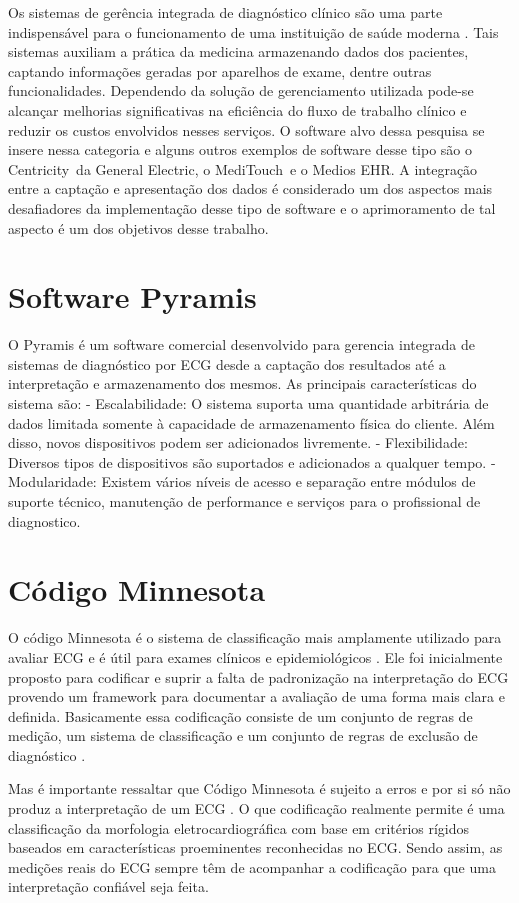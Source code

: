 Os sistemas de gerência integrada de diagnóstico clínico são uma parte indispensável para o funcionamento de uma instituição de saúde moderna \cite{McCormack2013}. Tais sistemas auxiliam a prática da medicina armazenando dados dos pacientes, captando informações geradas por aparelhos de exame, dentre outras funcionalidades. Dependendo da solução de gerenciamento utilizada pode-se alcançar melhorias significativas na eficiência do fluxo de trabalho clínico e reduzir os custos envolvidos nesses serviços. O software alvo dessa pesquisa se insere nessa categoria e alguns outros exemplos de software desse tipo são o Centricity\textcopyright\ da General Electric, o MediTouch\textcopyright\ e o Medios EHR\textcopyright. A integração entre a captação e apresentação dos dados é considerado um dos aspectos mais desafiadores da implementação desse tipo de software \cite{AMA} e o aprimoramento de tal aspecto é um dos objetivos desse trabalho.

\section{Software Pyramis}

O Pyramis é um software comercial desenvolvido para gerencia integrada de sistemas de diagnóstico por ECG desde a captação dos resultados até a interpretação e armazenamento dos mesmos.  As principais características do sistema são: - Escalabilidade: O sistema suporta uma quantidade arbitrária de dados limitada somente à capacidade de armazenamento física do cliente. Além disso, novos dispositivos podem ser adicionados livremente. - Flexibilidade: Diversos tipos de dispositivos são suportados e adicionados a qualquer tempo. - Modularidade: Existem vários níveis de acesso e separação entre módulos de suporte técnico, manutenção de performance e serviços para o profissional de diagnostico.

\section{Código Minnesota}

O código Minnesota é o sistema de classificação mais amplamente utilizado para avaliar ECG e é útil para exames clínicos e epidemiológicos \cite{Kors2000}. Ele foi inicialmente proposto para codificar e suprir a falta de padronização na interpretação do ECG provendo um framework para documentar a avaliação de uma forma mais clara e definida. Basicamente essa codificação consiste de um conjunto de regras de medição, um sistema de classificação e um conjunto de regras de exclusão de diagnóstico \cite{Kors1996}.

Mas é importante ressaltar que Código Minnesota é sujeito a erros e por si só não produz a interpretação de um ECG \cite{Macfarlane2000}. O que codificação realmente permite é uma classificação da morfologia eletrocardiográfica com base em critérios rígidos baseados em características proeminentes reconhecidas no ECG. Sendo assim, as medições reais do ECG sempre têm de acompanhar a codificação para que uma interpretação confiável seja feita.